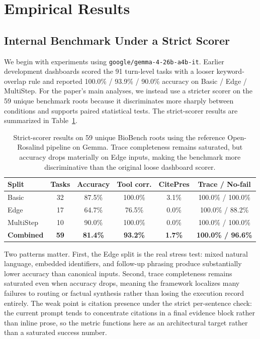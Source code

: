 \documentclass[11pt,letterpaper]{article}
\begin{document}
\section{Empirical Results}
\label{sec:experiments}

\subsection{Internal Benchmark Under a Strict Scorer}
We begin with experiments using \texttt{google/gemma-4-26b-a4b-it}. Earlier development dashboards scored the 91 turn-level tasks with a looser keyword-overlap rule and reported 100.0\% / 93.9\% / 90.0\% accuracy on Basic / Edge / MultiStep. For the paper's main analyses, we instead use a stricter scorer on the 59 unique benchmark roots because it discriminates more sharply between conditions and supports paired statistical tests. The strict-scorer results are summarized in Table~\ref{tab:bench}.

\begin{table}[h]
\centering
\small
\caption{Strict-scorer results on 59 unique BioBench roots using the reference Open-Rosalind pipeline on Gemma. Trace completeness remains saturated, but accuracy drops materially on Edge inputs, making the benchmark more discriminative than the original loose dashboard scorer.}
\label{tab:bench}
\renewcommand{\arraystretch}{1.25}
\begin{tabular}{@{}lccccc@{}}
\toprule
\textbf{Split} & \textbf{Tasks} & \textbf{Accuracy} & \textbf{Tool corr.} & \textbf{CitePres} & \textbf{Trace / No-fail} \\
\midrule
Basic      & 32 & 87.5\% & 100.0\% & 3.1\% & 100.0\% / 100.0\% \\
Edge       & 17 & 64.7\% & 76.5\%  & 0.0\% & 100.0\% / 88.2\% \\
MultiStep  & 10 & 90.0\% & 100.0\% & 0.0\% & 100.0\% / 100.0\% \\
\midrule
\textbf{Combined} & \textbf{59} & \textbf{81.4\%} & \textbf{93.2\%} & \textbf{1.7\%} & \textbf{100.0\% / 96.6\%} \\
\bottomrule
\end{tabular}
\end{table}

Two patterns matter. First, the Edge split is the real stress test: mixed natural language, embedded identifiers, and follow-up phrasing produce substantially lower accuracy than canonical inputs. Second, trace completeness remains saturated even when accuracy drops, meaning the framework localizes many failures to routing or factual synthesis rather than losing the execution record entirely. The weak point is citation presence under the strict per-sentence check: the current prompt tends to concentrate citations in a final evidence block rather than inline prose, so the metric functions here as an architectural target rather than a saturated success number.
\end{document}

